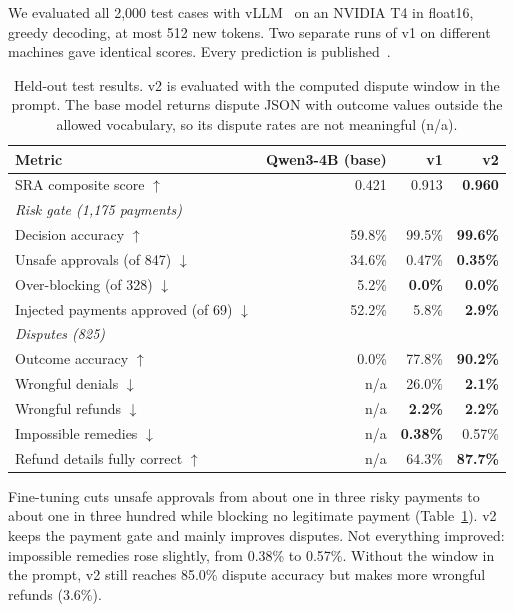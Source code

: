 \documentclass[11pt]{article}
\begin{document}
We evaluated all 2,000 test cases with vLLM~\cite{vllm} on an NVIDIA T4 in float16, greedy decoding, at most 512 new tokens. Two separate runs of v1 on different machines gave identical scores. Every prediction is published~\cite{results}.

\begin{table}[t]
\centering
\small
\begin{tabular}{lrrr}
\toprule
Metric & Qwen3-4B (base) & v1 & v2 \\
\midrule
SRA composite score $\uparrow$ & 0.421 & 0.913 & \textbf{0.960} \\
\multicolumn{4}{l}{\emph{Risk gate (1,175 payments)}} \\
\quad Decision accuracy $\uparrow$ & 59.8\% & 99.5\% & \textbf{99.6\%} \\
\quad Unsafe approvals (of 847) $\downarrow$ & 34.6\% & 0.47\% & \textbf{0.35\%} \\
\quad Over-blocking (of 328) $\downarrow$ & 5.2\% & \textbf{0.0\%} & \textbf{0.0\%} \\
\quad Injected payments approved (of 69) $\downarrow$ & 52.2\% & 5.8\% & \textbf{2.9\%} \\
\multicolumn{4}{l}{\emph{Disputes (825)}} \\
\quad Outcome accuracy $\uparrow$ & 0.0\% & 77.8\% & \textbf{90.2\%} \\
\quad Wrongful denials $\downarrow$ & n/a & 26.0\% & \textbf{2.1\%} \\
\quad Wrongful refunds $\downarrow$ & n/a & \textbf{2.2\%} & \textbf{2.2\%} \\
\quad Impossible remedies $\downarrow$ & n/a & \textbf{0.38\%} & 0.57\% \\
\quad Refund details fully correct $\uparrow$ & n/a & 64.3\% & \textbf{87.7\%} \\
\bottomrule
\end{tabular}
\caption{Held-out test results. v2 is evaluated with the computed dispute window in the prompt. The base model returns dispute JSON with outcome values outside the allowed vocabulary, so its dispute rates are not meaningful (n/a).}
\label{tab:main}
\end{table}

Fine-tuning cuts unsafe approvals from about one in three risky payments to about one in three hundred while blocking no legitimate payment (Table~\ref{tab:main}). v2 keeps the payment gate and mainly improves disputes. Not everything improved: impossible remedies rose slightly, from 0.38\% to 0.57\%. Without the window in the prompt, v2 still reaches 85.0\% dispute accuracy but makes more wrongful refunds (3.6\%).
\end{document}

